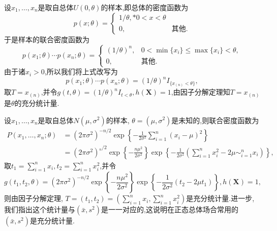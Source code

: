 \begin{example}\label{exam:5.5.4}
设$x_1,\dotsc,x_n$是取自总体$U(0,\theta)$的样本,即总体的密度函数为
\[p(x;\theta)=\begin{cases}
1/\theta,*0<x<\theta\\
0,&\text{其他.}
\end{cases}\]
于是样本的联合密度函数为
\[p(x_1;\theta)\dotsm p(x_n;\theta)=\begin{cases}
(1/\theta)^n,&0<\min\{x_i\}\leq\max\{x_i\}<\theta,\\
0,&\text{其他}.
\end{cases}\]
由于诸$x_i>0$,所以我们将上式改写为
\[p(x_1;\theta)\dotsm p(x_n;\theta)=(1/\theta)^nI_{\{x_{(n)}<\theta\}},\]
取$T=x_{(n)}$,并令$g(t,\theta)=(1/\theta)^nI_{t<\theta},h(\bm X)=1$,由因子分解定理知$T=x_{(n)}$是$\theta$的充分统计量.
\end{example}
\begin{example}
设$x_1,\dotsc,x_n$是取自总体$N(\mu,\sigma^2)$的样本, $\theta=(\mu,\sigma^2)$是未知的,则联合密度函数为
\begin{align*}
P(x_1,\dotsc,x_n;\theta)&=(2\pi\sigma^2)^{-n/2}\exp\left\{-\frac1{2\sigma^2}\sum_{i=1}^n
(x_i-\mu)^2\right\}\\
&=(2\pi\sigma^2)^{_n/2}\exp\left\{-\frac{n\mu^2}{2\sigma^2}\right\}
\exp\left\{-\frac1{2\sigma^2}\left(\sum_{i=1}^nx_i^2-2\mu\sim_{i=1}^n x_i\right)\right\},
\end{align*}
取$t_1=\sum_{i=1}^nx_i,t_2=\sum_{i=1}^nx_i^2$,并令
\[g(t_1,t_2,\theta)=(2\pi\sigma^2)^{-n/2}\exp\left\{-\frac{n\mu^2}{2\sigma^2}\right\}
\exp\left\{-\frac1{2\sigma^2}(t_2-2\mu t_1)\right\},h(\bm X)=1,\]
则由因子分解定理, $T=(t_1,t_2)=\left(\sum_{i=1}^nx_i,\sum_{i=1}^n x_i^2\right)$是充分统计量.进一步,我们指出这个统计量与$(\bar x,s^2)$是一一对应的,这说明在正态总体场合常用的$(\bar x,s^2)$是充分统计量.
\end{example}
